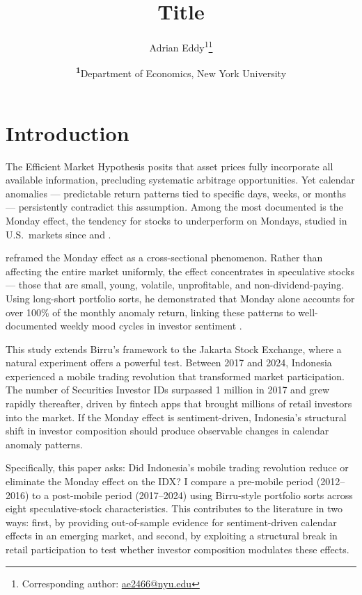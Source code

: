 \documentclass[
	a4paper,
	10pt,
	twoside,
]{LTJournalArticle}
\title{Title}
\author{%
	Adrian Eddy\textsuperscript{1}\thanks{Corresponding author: \href{mailto:ae2466@nyu.edu}{ae2466@nyu.edu}}
}
\date{\footnotesize\textsuperscript{\textbf{1}}Department of Economics, New York University}
\begin{document}
\maketitle


\section{Introduction}

The Efficient Market Hypothesis posits that asset prices fully incorporate all available information, precluding systematic arbitrage opportunities. Yet calendar anomalies --- predictable return patterns tied to specific days, weeks, or months --- persistently contradict this assumption. Among the most documented is the Monday effect, the tendency for stocks to underperform on Mondays, studied in U.S.\ markets since \citet{french1980} and \citet{gibbons1981}.

\citet{birru2018} reframed the Monday effect as a cross-sectional phenomenon. Rather than affecting the entire market uniformly, the effect concentrates in speculative stocks --- those that are small, young, volatile, unprofitable, and non-dividend-paying. Using long-short portfolio sorts, he demonstrated that Monday alone accounts for over 100\% of the monthly anomaly return, linking these patterns to well-documented weekly mood cycles in investor sentiment \citep{baker2006}.

This study extends Birru's framework to the Jakarta Stock Exchange, where a natural experiment offers a powerful test. Between 2017 and 2024, Indonesia experienced a mobile trading revolution that transformed market participation. The number of Securities Investor IDs surpassed 1 million in 2017 and grew rapidly thereafter, driven by fintech apps that brought millions of retail investors into the market. If the Monday effect is sentiment-driven, Indonesia's structural shift in investor composition should produce observable changes in calendar anomaly patterns.

Specifically, this paper asks: Did Indonesia's mobile trading revolution reduce or eliminate the Monday effect on the IDX? I compare a pre-mobile period (2012--2016) to a post-mobile period (2017--2024) using Birru-style portfolio sorts across eight speculative-stock characteristics. This contributes to the literature in two ways: first, by providing out-of-sample evidence for sentiment-driven calendar effects in an emerging market, and second, by exploiting a structural break in retail participation to test whether investor composition modulates these effects.
\end{document}
